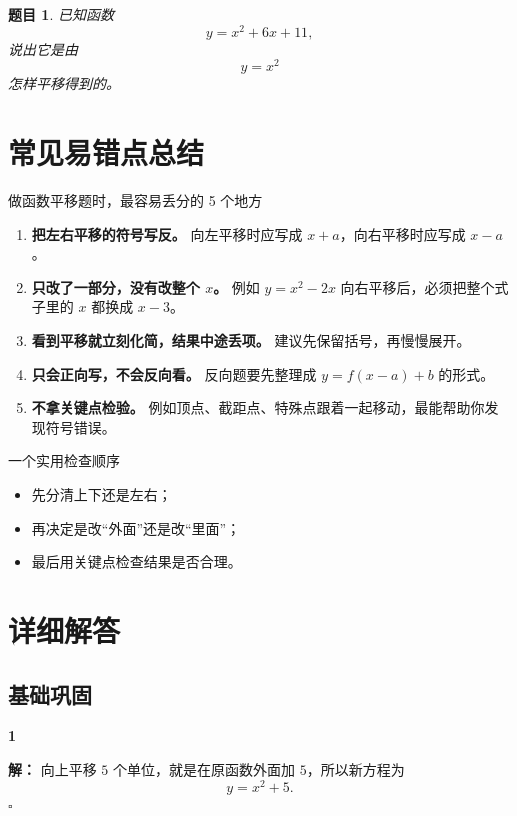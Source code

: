 \documentclass[11pt,a4paper,fontset=fandol]{ctexart}
\theoremstyle{formalexample}
\newtheorem{exercise}{题目}[section]
\newenvironment{solution}{\par\noindent\textbf{解：}}{\hfill$\square$\par}
\begin{document}
\begin{exercise}
已知函数
\[
y=x^2+6x+11,
\]
说出它是由
\[
y=x^2
\]
怎样平移得到的。
\end{exercise}

\newpage
\section{常见易错点总结}

\begin{goalbox}{做函数平移题时，最容易丢分的 5 个地方}
\begin{enumerate}
  \item \textbf{把左右平移的符号写反。}  
  向左平移时应写成 $x+a$，向右平移时应写成 $x-a$。

  \item \textbf{只改了一部分，没有改整个 $x$。}  
  例如 $y=x^2-2x$ 向右平移后，必须把整个式子里的 $x$ 都换成 $x-3$。

  \item \textbf{看到平移就立刻化简，结果中途丢项。}  
  建议先保留括号，再慢慢展开。

  \item \textbf{只会正向写，不会反向看。}  
  反向题要先整理成 $y=f(x-a)+b$ 的形式。

  \item \textbf{不拿关键点检验。}  
  例如顶点、截距点、特殊点跟着一起移动，最能帮助你发现符号错误。
\end{enumerate}
\end{goalbox}

\begin{notebox}{一个实用检查顺序}
\begin{itemize}
  \item 先分清上下还是左右；
  \item 再决定是改“外面”还是改“里面”；
  \item 最后用关键点检查结果是否合理。
\end{itemize}
\end{notebox}

\newpage
\appendix
\section{详细解答}

\subsection*{基础巩固}

\textbf{1}\begin{solution}
向上平移 $5$ 个单位，就是在原函数外面加 $5$，所以新方程为
\[
\boxed{y=x^2+5}.
\]
\end{solution}
\end{document}
